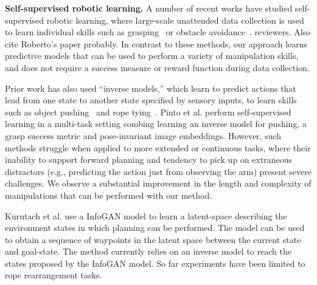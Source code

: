 \noindent \textbf{Self-supervised robotic learning.}
A number of recent works have studied self-supervised robotic learning, where large-scale unattended data collection is used to learn individual skills such as grasping~\cite{mottaghi2016happens, lerrel,google_handeye} or obstacle avoidance~\cite{greg_kahn_uncertainty,crashing}. 
 reviewers. Also cite Roberto's paper probably.
In contrast to these methods, our approach learns predictive models that can be used to perform a variety of manipulation skills, and does not require a success measure or reward function during data collection. 

Prior work has also used ``inverse models,'' which learn to predict actions that lead from one state to another state specified by sensory inputs, to learn skills such as object pushing~\cite{agrawal2016learning} and rope tying~\cite{nair2017combining}.
Pinto et al. \cite{pinto2016curious} perform self-supervised learning in a multi-task setting combing learning an inverse model for pushing, a grasp success metric and pose-invariant image embeddings.
However, such methods struggle when applied to more extended or continuous tasks, where their inability to support forward planning and tendency to pick up on extraneous distractors (e.g., predicting the action just from observing the arm) present severe challenges. We observe a substantial improvement in the length and complexity of manipulations that can be performed with our method.

Kurutach et al. use a InfoGAN model \cite{kurutach2018learning} to learn a latent-space describing the environment states in which planning can be performed. The model can be used to obtain a sequence of waypoints in the latent space between the current state and goal-state. The method currently relies on an inverse model to reach the states proposed by the InfoGAN model. So far experiments have been limited to rope rearrangement tasks.


